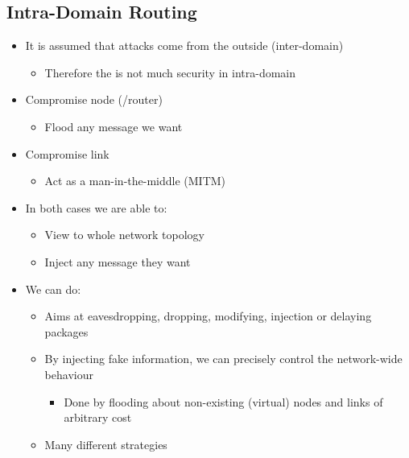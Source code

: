 \subsection{Intra-Domain Routing}
\begin{itemize}
    \item It is assumed that attacks come from the outside (inter-domain)
        \begin{itemize}
            \item Therefore the is not much security in intra-domain
        \end{itemize}
    \item Compromise node (/router)
        \begin{itemize}
            \item Flood any message we want
        \end{itemize}
    \item Compromise link
        \begin{itemize}
            \item Act as a man-in-the-middle (MITM)
        \end{itemize}
    \item In both cases we are able to:
        \begin{itemize}
            \item View to whole network topology
            \item Inject any message they want
        \end{itemize}
    \item We can do:
        \begin{itemize}
                \begin{itemize}
                    \item Aims at eavesdropping, dropping, modifying, injection or delaying packages
                    \item By injecting fake information, we can precisely control the network-wide behaviour
                        \begin{itemize}
                            \item Done by flooding about non-existing (virtual) nodes and links of arbitrary cost
                        \end{itemize}
                \end{itemize}
                \begin{itemize}
                    \item Many different strategies

\end{itemize}
\end{itemize}
\end{itemize}
